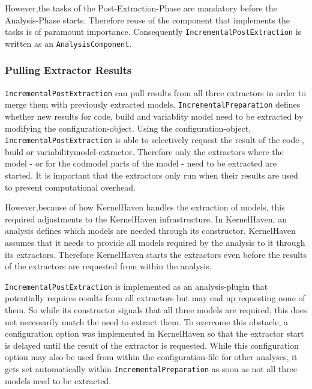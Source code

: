 \documentclass[a4paper]{article}
\begin{document}
However,the tasks of the Post-Extraction-Phase are mandatory before the Analysis-Phase starts. Therefore reuse of the component that implements the tasks is of paramount importance. Consequently \texttt{Incremental\-Post\-Extraction} is written as an \texttt{Analysis\-Component}.

\subsubsection{Pulling Extractor Results}

\texttt{Incremental\-Post\-Extraction} can pull results from all three extractors in order to merge them with previously extracted models. \texttt{Incremental\-Preparation} defines whether new results for code, build and variablity model need to be extracted by modifying the configuration-object. Using the configuration-object, \texttt{Incremental\-Post\-Extraction} is able to selectively request the result of the code-, build or variabilitymodel-extractor. Therefore only the extractors where the model - or for the codmodel parts of the model - need to be extracted are started. It is important that the extractors only run when their results are used to prevent computational overhead.

However,because of how KernelHaven handles the extraction of models, this required adjustments to the KernelHaven infrastructure. In KernelHaven, an analysis defines which models are needed through its constructor. KernelHaven assumes that it needs to provide all models required by the analysis to it through its extractors. Therefore KernelHaven starts the extractors even before the results of the extractors are requested from within the analysis. 

\texttt{Incremental\-Post\-Extraction} is implemented as an analysis-plugin that potentially requires results from all extractors but may end up requesting none of them. So while its constructor signals that all three models are required, this does not necessarily match the need to extract them. To overcome this obstacle, a configuration option was implemented in KernelHaven so that the extractor start is delayed until the result of the extractor is requested. While this configuration option may also be used from within the configuration-file for other analyses, it gets set automatically within \texttt{Incremental\-Preparation} as soon as not all three models need to be extracted.
\end{document}
